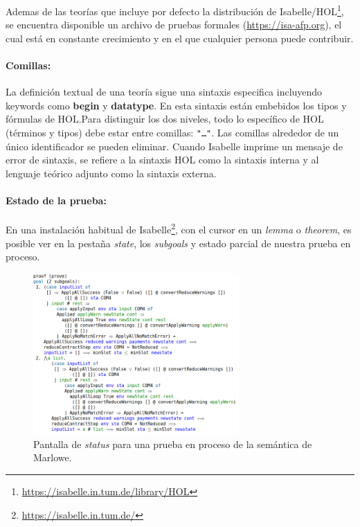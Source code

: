 \documentclass[12pt]{book}
\begin{document}
Ademas de las teorías que incluye por defecto la distribución de Isabelle/HOL\footnote{\url{https://isabelle.in.tum.de/library/HOL}}, se encuentra disponible un archivo de pruebas formales (\url{https://isa-afp.org}), el cual está en constante crecimiento y en el que cualquier persona puede contribuir.


\paragraph{Comillas:}
La definición textual de una teoría sigue una sintaxis especifica incluyendo keywords como \textbf{begin} y \textbf{datatype}. En esta sintaxis están embebidos los tipos y fórmulas de HOL.\@ Para distinguir los dos niveles, todo lo específico de HOL (términos y tipos) debe estar entre comillas: \texttt{"\ldots"}. Las comillas alrededor de un único identificador se pueden eliminar. Cuando Isabelle imprime un mensaje de error de sintaxis, se refiere a la sintaxis HOL como la sintaxis interna y al lenguaje teórico adjunto como la sintaxis externa.%

\paragraph{Estado de la prueba:} 

En una instalación habitual de Isabelle\footnote{\url{https://isabelle.in.tum.de/}}, con el cursor en un \textit{lemma} o \textit{theorem}, es posible ver en la pestaña \textit{state}, los \textit{subgoals} y estado parcial de nuestra prueba en proceso.

\begin{figure}[H]
	\centering
    \includegraphics[width=0.7\textwidth]{Proof_state_isabelle.png}
	\caption{Pantalla de \textit{status} para una prueba en proceso de la semántica de Marlowe.}\label{fig:Proof_state}
\end{figure}
\end{document}
